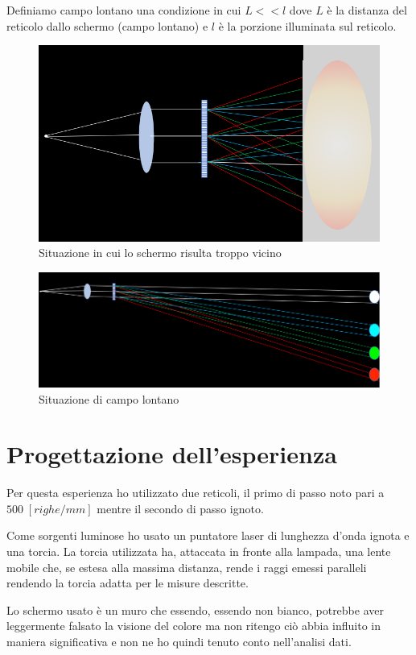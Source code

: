 \documentclass{article}
\begin{document}
\vspace{3mm}

Definiamo campo lontano una condizione in cui $L << l$ dove $L$ è la distanza del reticolo dallo schermo (campo lontano) e $l$ è la porzione illuminata sul reticolo.


\begin{figure}[h!]
  \centering
  \includegraphics[width=0.4\linewidth]{IM reticolo collimato vicino}
  \caption{Situazione in cui lo schermo risulta troppo vicino}
\end{figure}

\begin{figure}[h!]
  \centering
  \includegraphics[width=0.4\linewidth]{IM reticolo collimato lontano}
  \caption{Situazione di campo lontano}
\end{figure}


\pagebreak
\section{Progettazione dell'esperienza}
Per questa esperienza ho utilizzato due reticoli, il primo di passo noto pari a $500 \; [righe/mm]$ mentre il secondo di passo ignoto. 

\vspace{3mm}

Come sorgenti luminose ho usato un puntatore laser di lunghezza d'onda ignota e una torcia. La torcia utilizzata ha, attaccata in fronte alla lampada, una lente mobile che, se estesa alla massima distanza, rende i raggi emessi paralleli rendendo la torcia adatta per le misure descritte.

\vspace{3mm}

Lo schermo usato è un muro che essendo, essendo non bianco, potrebbe aver leggermente falsato la visione del colore ma non ritengo ciò abbia influito in maniera significativa e non ne ho quindi  tenuto conto nell'analisi dati.
\end{document}
